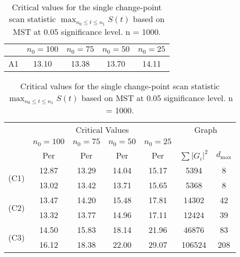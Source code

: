 \documentclass[arxiv, preprint]{imsart}
\numberwithin{equation}{section}
\theoremstyle{plain}
\begin{document}
\begin{table}[h]
\centering 
 \caption{Critical values for the single change-point scan statistic $\max_{n_0 \le t \le n_1} S(t)$ based on MST at 0.05 significance level. n = 1000.}
  \label{table:S_CV05_reduced}
\begin{tabular}{|c|c|c|c|c|}
\hline  
\hline
& $n_0 = 100$ & $n_0 = 75$ & $n_0 = 50$ & $n_0 = 25$\\
\hline
A1  & 13.10 & 13.38 & 13.70 & 14.11 \\
\hline 
\end{tabular} 

\vspace{2mm}

\begin{tabular}{c|c|c|c|c|cc} 
\hline  
\hline
& \multicolumn{4}{c}{Critical Values} & \multicolumn{2}{|c}{Graph} \\
\cline{2-7}
& \multicolumn{1}{|c|}{$n_0 = 100$} &  \multicolumn{1}{|c|}{$n_0 = 75$} &  \multicolumn{1}{|c|}{$n_0 = 50$} &  \multicolumn{1}{|c|}{$n_0 = 25$} \\
\cline{2-5}
& Per &  Per & Per & Per & $\sum|G_i|^2$ & $d_{\max}$ \\
\hline 
\hline
\multirow{2}{0.7cm}{(C1)}
& 12.87 & 13.29 & 14.04 & 15.17 & 5394 &  8\\
& 13.02 & 13.42 & 13.71 & 15.65 & 5368 &  8\\
\hline
\multirow{2}{0.7cm}{(C2)}
& 13.47 & 14.20 & 15.48 & 17.81 & 14302 & 42 \\
& 13.32 & 13.77 & 14.96 & 17.11 & 12424 & 39 \\
\hline
\multirow{2}{0.7cm}{(C3)}
& 14.50 & 15.83 & 18.14 & 21.96 &  46876 &  83\\
& 16.12 & 18.38 & 22.00 & 29.07 & 106524 & 208\\
\hline
\hline 
\end{tabular} 
\end{table} 
\end{document}
